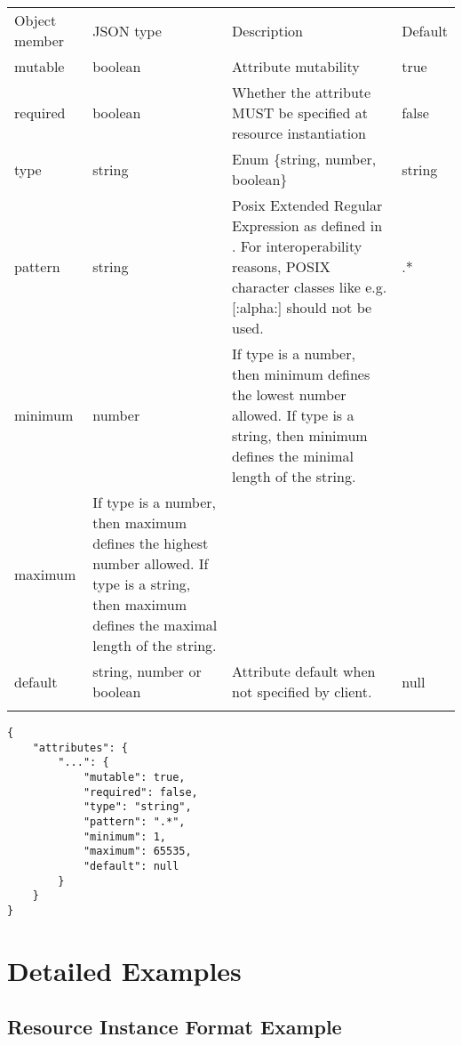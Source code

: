\documentclass[10pt,a4paper]{article}
\begin{document}
 {
    \begin{tabular}{llll}
    \toprule
    Object member & JSON type & Description & Default \\
    \colrule
    mutable & boolean & Attribute mutability & true \\
    required & boolean & Whether the attribute MUST be specified at resource instantiation & false \\
    type & string & Enum \{string, number, boolean\}
    & string \\
    pattern & string & Posix Extended Regular Expression as defined in \cite{iso9945:2009}. For interoperability reasons, POSIX character classes like e.g. [:alpha:] should not be used. & .* \\
    minimum & number & If type is a number, then minimum defines the lowest number allowed. If type is a string, then minimum defines the minimal length of the string. \\
    maximum & If type is a number, then maximum defines the highest number allowed. If type is a string, then maximum defines the maximal length of the string.\\
    default & string, number or boolean & Attribute default when not specified by client. & null \\
    \botrule
    \end{tabular}
}
\begin{verbatim}
{
    "attributes": {
        "...": {
            "mutable": true,
            "required": false,
            "type": "string",
            "pattern": ".*",
            "minimum": 1,
            "maximum": 65535,
            "default": null
        }
    }
}
\end{verbatim}

\section{Detailed Examples}
\label{sec:examples}

\subsection{Resource Instance Format Example}
\label{sec:example_resource}
\end{document}
